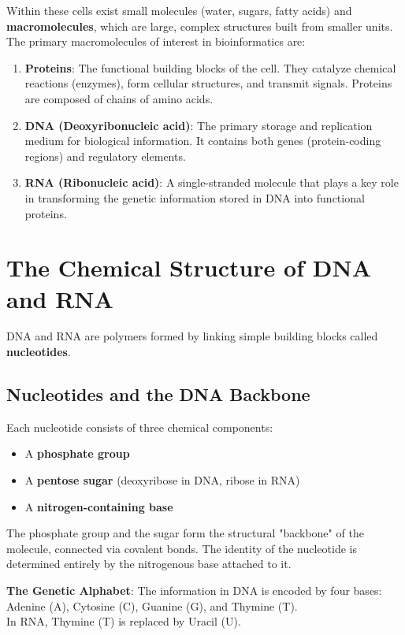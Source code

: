 \documentclass[11pt,a4paper]{article}
\newenvironment{important}{
    \vspace{1em}
    \begin{tcolorbox}[colback=blue!5!white, colframe=blue!75!black, boxrule=1pt, arc=4pt, left=10pt, right=10pt, top=10pt, bottom=10pt]
}{
    \end{tcolorbox}
    \vspace{1em}
}
\begin{document}

Within these cells exist small molecules (water, sugars, fatty acids) and \textbf{macromolecules}, which are large, complex structures built from smaller units. The primary macromolecules of interest in bioinformatics are:
\begin{enumerate}
    \item \textbf{Proteins}: The functional building blocks of the cell. They catalyze chemical reactions (enzymes), form cellular structures, and transmit signals. Proteins are composed of chains of amino acids.
    \item \textbf{DNA (Deoxyribonucleic acid)}: The primary storage and replication medium for biological information. It contains both genes (protein-coding regions) and regulatory elements. 
    \item \textbf{RNA (Ribonucleic acid)}: A single-stranded molecule that plays a key role in transforming the genetic information stored in DNA into functional proteins.
\end{enumerate}

\section{The Chemical Structure of DNA and RNA}

DNA and RNA are polymers formed by linking simple building blocks called \textbf{nucleotides}. 

\subsection{Nucleotides and the DNA Backbone}
Each nucleotide consists of three chemical components:
\begin{itemize}
    \item A \textbf{phosphate group}
    \item A \textbf{pentose sugar} (deoxyribose in DNA, ribose in RNA)
    \item A \textbf{nitrogen-containing base}
\end{itemize}

The phosphate group and the sugar form the structural "backbone" of the molecule, connected via covalent bonds. The identity of the nucleotide is determined entirely by the nitrogenous base attached to it. 

\begin{important}
    \textbf{The Genetic Alphabet}: The information in DNA is encoded by four bases:
    Adenine (A), Cytosine (C), Guanine (G), and Thymine (T). \\
    In RNA, Thymine (T) is replaced by Uracil (U).
\end{important}
\end{document}

